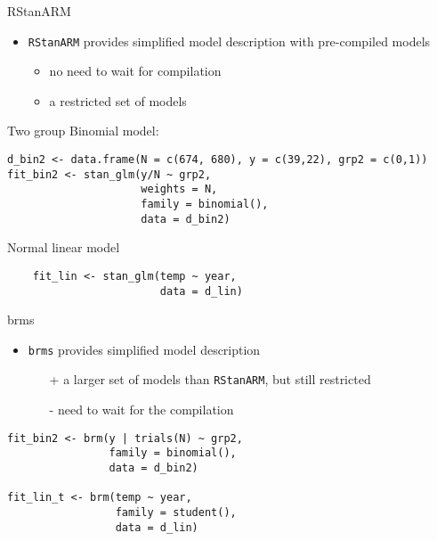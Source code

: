 \documentclass[finnish,english,t]{beamer}
\begin{document}
\begin{frame}[fragile]{RStanARM}

  \begin{itemize}
  \item \texttt{RStanARM} provides simplified model description with
    pre-compiled models
    \begin{itemize}
    \item no need to wait for compilation
    \item a restricted set of models
    \end{itemize}
  \end{itemize}

Two group Binomial model:
  {\footnotesize
\begin{verbatim}
d_bin2 <- data.frame(N = c(674, 680), y = c(39,22), grp2 = c(0,1))
fit_bin2 <- stan_glm(y/N ~ grp2,
                     weights = N,
                     family = binomial(),
                     data = d_bin2)
\end{verbatim}
  }
    Normal linear model
  {\footnotesize
\begin{verbatim}
    fit_lin <- stan_glm(temp ~ year,
                        data = d_lin)
\end{verbatim}
  }

    
\end{frame} 


\begin{frame}[fragile]{brms}

  \begin{itemize}
  \item \texttt{brms} provides simplified model description
    \begin{itemize}
    \item[+] a larger set of models than \texttt{RStanARM}, but still restricted
    \item[-] need to wait for the compilation
    \end{itemize}
  \end{itemize}

  {\footnotesize
\begin{verbatim}
fit_bin2 <- brm(y | trials(N) ~ grp2,
                family = binomial(),
                data = d_bin2)

fit_lin_t <- brm(temp ~ year,
                 family = student(),
                 data = d_lin)
\end{verbatim}
  }
    
\end{frame} 
\end{document}
